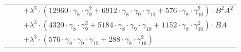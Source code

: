 \documentclass{article}
\begin{document}
\begin{table}[!hp]
\begin{center}
\begin{tabular}{rcl}
 & & $ + {\lambda}^3{\cdot}(12960{\cdot}{\gamma}_{8}{\cdot}{\gamma}_{9}^{2}+6912{\cdot}{\gamma}_{8}{\cdot}{\gamma}_{9}{\cdot}{\gamma}_{10}+576{\cdot}{\gamma}_{8}{\cdot}{\gamma}_{10}^{2}){\cdot}B^{2}A^{2}$ \\
 & & $ + {\lambda}^3{\cdot}(4320{\cdot}{\gamma}_{8}{\cdot}{\gamma}_{9}^{2}+5184{\cdot}{\gamma}_{8}{\cdot}{\gamma}_{9}{\cdot}{\gamma}_{10}+1152{\cdot}{\gamma}_{8}{\cdot}{\gamma}_{10}^{2}){\cdot}BA$ \\
 & & $ + {\lambda}^3{\cdot}(576{\cdot}{\gamma}_{8}{\cdot}{\gamma}_{9}{\cdot}{\gamma}_{10}+288{\cdot}{\gamma}_{8}{\cdot}{\gamma}_{10}^{2})$ \\
\end{tabular}
\end{center}
\end{table}

\newpage
\end{document}
